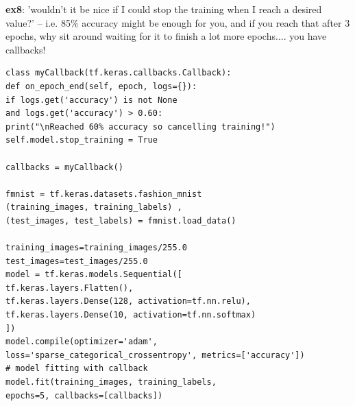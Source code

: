 \documentclass[20pt]{article}
\begin{document}
\begin{itemize}
		\textbf{ex8}: 'wouldn't it be nice if I could stop the training when I reach a desired value?' -- i.e. 85\% accuracy might be enough for you, and if you reach that after 3 epochs, why sit around waiting for it to finish a lot more epochs.... you have callbacks!
		\begin{verbatim}
class myCallback(tf.keras.callbacks.Callback):
def on_epoch_end(self, epoch, logs={}):
if logs.get('accuracy') is not None
and logs.get('accuracy') > 0.60:
print("\nReached 60% accuracy so cancelling training!")
self.model.stop_training = True

callbacks = myCallback()

fmnist = tf.keras.datasets.fashion_mnist
(training_images, training_labels) , 
(test_images, test_labels) = fmnist.load_data()

training_images=training_images/255.0
test_images=test_images/255.0
model = tf.keras.models.Sequential([
tf.keras.layers.Flatten(),
tf.keras.layers.Dense(128, activation=tf.nn.relu),
tf.keras.layers.Dense(10, activation=tf.nn.softmax)
])
model.compile(optimizer='adam',
loss='sparse_categorical_crossentropy', metrics=['accuracy'])
# model fitting with callback
model.fit(training_images, training_labels,
epochs=5, callbacks=[callbacks])
		\end{verbatim}
	\end{itemize}
\end{document}
